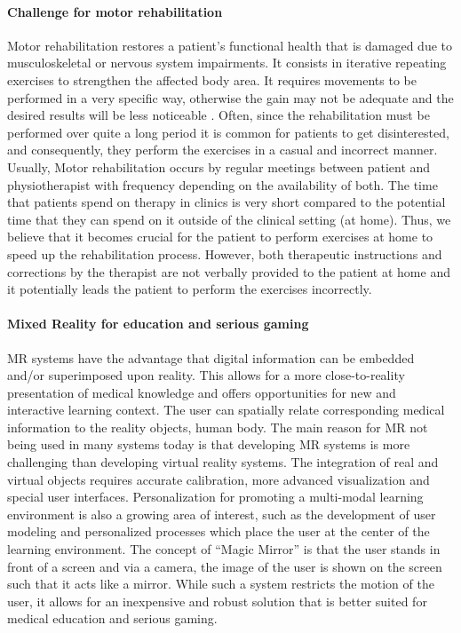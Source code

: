 \paragraph{Challenge for motor rehabilitation}
Motor rehabilitation restores a patient's functional health that is damaged due to musculoskeletal or nervous system impairments. It consists in iterative repeating exercises to strengthen the affected body area. It requires movements to be performed in a very specific way, otherwise the gain may not be adequate and the desired results will be less noticeable \cite{Merians2006,Ustinova2014}. Often, since the rehabilitation must be performed over quite a long period it is common for patients to get disinterested, and consequently, they perform the exercises in a casual and incorrect manner. Usually, Motor rehabilitation occurs by regular meetings between patient and physiotherapist with frequency depending on the availability of both. The time that patients spend on therapy in clinics is very short compared to the potential time that they can spend on it outside of the clinical setting (\eg at home). Thus, we believe that it becomes crucial for the patient to perform exercises at home to speed up the rehabilitation process. However, both therapeutic instructions and corrections by the therapist are not verbally provided to the patient at home and it potentially leads the patient to perform the exercises incorrectly.

\paragraph{Mixed Reality for education and serious gaming}
MR systems have the advantage that digital information can be embedded and/or superimposed upon reality. This allows for a more close-to-reality presentation of medical knowledge and offers opportunities for new and interactive learning context. 
The user can spatially relate corresponding medical information to the reality objects, \eg human body. 
The main reason for MR not being used in many systems today is that developing MR systems is more challenging than developing virtual reality systems. 
The integration of real and virtual objects requires accurate calibration, more advanced visualization and special user interfaces.
Personalization for promoting a multi-modal learning environment is also a growing area of interest, such as the development of user modeling and personalized processes which place the user at the center of the learning environment.
The concept of ``Magic Mirror'' is that the user stands in front of a screen and via a camera, the image of the user is shown on the screen such that it acts like a mirror. While such a system restricts the motion of the user, it allows for an inexpensive and robust solution that is better suited for medical education and serious gaming.  

